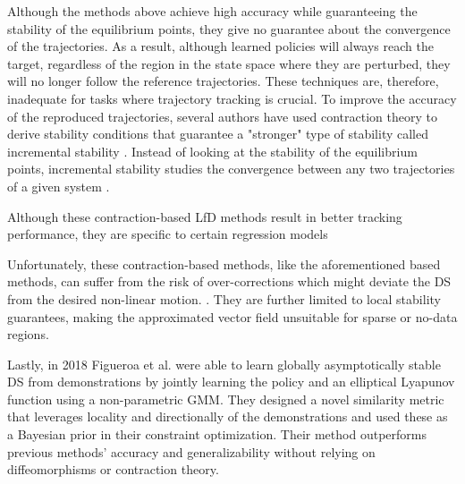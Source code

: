
Although the methods above achieve high accuracy while guaranteeing the stability of the equilibrium points, they give no guarantee about the convergence of the trajectories. As a result, although learned policies will always reach the target, regardless of the region in the state space where they are perturbed, they will no longer follow the reference trajectories. These techniques are, therefore, inadequate for tasks where trajectory tracking is crucial. To improve the accuracy of the reproduced trajectories, several authors have used contraction theory to derive stability conditions that guarantee a "stronger" type of stability called incremental stability \cite{ravichandarLearningContractingNonlinear2016,blocherLearningStableDynamical2017}. Instead of looking at the stability of the equilibrium points, incremental stability studies the convergence between any two trajectories of a given system \cite{lohmillerContractionAnalysisNonlinear1998}.

Although these contraction-based LfD methods result in better tracking performance, they are specific to certain regression models

Unfortunately, these contraction-based methods, like the aforementioned based methods, can suffer from the risk of over-corrections which might deviate the DS from the desired non-linear motion. \cite{figueroafernandezPhysicallyconsistentBayesianNonparametric2018}. They are further limited to local stability guarantees, making the approximated vector field unsuitable for sparse or no-data regions.

Lastly, in 2018 Figueroa et al. \cite{figueroafernandezPhysicallyconsistentBayesianNonparametric2018} were able to learn globally asymptotically stable DS from demonstrations by jointly learning the policy and an elliptical Lyapunov function using a non-parametric GMM. They designed a novel similarity metric that leverages locality and directionally of the demonstrations and used these as a Bayesian prior in their constraint optimization. Their method outperforms previous methods' accuracy and generalizability without relying on diffeomorphisms or contraction theory.















